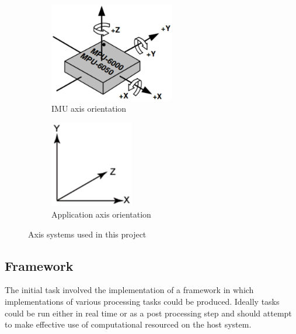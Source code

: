 \documentclass{entcs}
\begin{document}
\begin{figure}[h!]
  \centering
  \begin{subfigure}[b]{0.4\textwidth}
    \centering
    \includegraphics[width=0.6\textwidth]{graphics/mpu6000_axis_orientation.eps}
    \caption{IMU axis orientation \cite{mpu6000_datasheet}}
    \label{fig:mpu6000_axis_orientation}
  \end{subfigure}
  \begin{subfigure}[b]{0.4\textwidth}
    \centering
    \includegraphics[width=0.4\textwidth]{graphics/application_coordinate_system.eps}
    \caption{Application axis orientation}
    \label{fig:application_axis_orientation}
  \end{subfigure}
  \caption{Axis systems used in this project}
\end{figure}

\subsection{Framework}
\label{sec:implementation_framework}

The initial task involved the implementation of a framework in which
implementations of various processing tasks could be produced. Ideally tasks
could be run either in real time or as a post processing step and should attempt
to make effective use of computational resourced on the host system.
\end{document}
